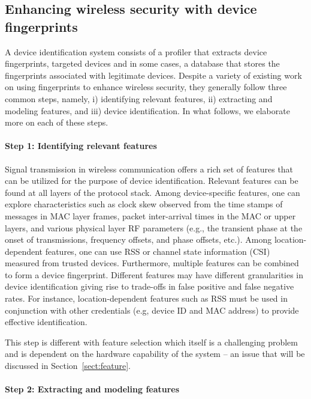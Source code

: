 \documentclass[journal,draftcls,onecolumn,11pt]{IEEEtran}
\begin{document}
\subsection{Enhancing wireless security with device fingerprints}

A device identification system consists of a profiler that extracts device fingerprints, targeted devices and in some cases, a database that stores the fingerprints associated with legitimate devices. Despite a variety of existing work on using fingerprints to enhance wireless security, they generally follow three common steps, namely, i) identifying relevant features, ii) extracting and modeling features, and iii) device identification.  In what follows, we elaborate more on each of these steps.

\paragraph*{Step 1: Identifying relevant features}

Signal transmission in wireless communication offers a rich set of features that can be utilized for the purpose of device identification. Relevant features can be found at all layers of the protocol stack. Among device-specific features, one can explore characteristics such as clock skew observed from the time stamps of messages in MAC layer frames, packet inter-arrival times in the MAC or upper layers, and various physical layer RF parameters (e.g., the transient phase at the onset of transmissions, frequency offsets, and phase offsets, etc.). Among location-dependent features, one can use RSS or channel state information (CSI) measured from trusted devices.  Furthermore, multiple features can be combined to form a device fingerprint.  Different features may have different granularities in device identification giving rise to trade-offs in false positive and false negative rates.  For instance, location-dependent features such as RSS must be used in conjunction with other credentials (e.g, device ID and MAC address) to provide effective identification.

This step is different with feature selection which itself is a challenging problem and is dependent on the hardware capability of the system -- an issue that will be discussed in Section~\ref{sect:feature}.

\paragraph*{Step 2: Extracting and modeling features}
\end{document}
